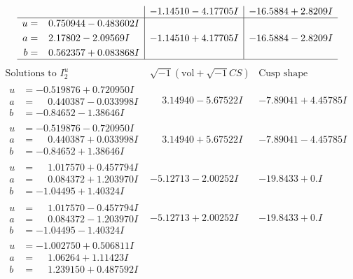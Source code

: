 \documentclass[1p]{elsarticle_modified}
\theoremstyle{definition}
\newcommand{\I}{\sqrt{-1}}
\begin{document}
$$\begin{array}{c|c|c}
 & -1.14510 - 4.17705 I & -16.5884 + 2.8209 I \\ \hline\begin{aligned}
u &= \phantom{-}0.750944 - 0.483602 I \\
a &= \phantom{-}2.17802 - 2.09569 I \\
b &= \phantom{-}0.562357 + 0.083868 I\end{aligned}
 & -1.14510 + 4.17705 I & -16.5884 - 2.8209 I\\
 \hline 
 \end{array}$$\newpage$$\begin{array}{c|c|c}  
\text{Solutions to }I^u_{2}& \I (\text{vol} + \sqrt{-1}CS) & \text{Cusp shape}\\
 \hline 
\begin{aligned}
u &= -0.519876 + 0.720950 I \\
a &= \phantom{-}0.440387 - 0.033998 I \\
b &= -0.84652 - 1.38646 I\end{aligned}
 & \phantom{-}3.14940 - 5.67522 I & -7.89041 + 4.45785 I \\ \hline\begin{aligned}
u &= -0.519876 - 0.720950 I \\
a &= \phantom{-}0.440387 + 0.033998 I \\
b &= -0.84652 + 1.38646 I\end{aligned}
 & \phantom{-}3.14940 + 5.67522 I & -7.89041 - 4.45785 I \\ \hline\begin{aligned}
u &= \phantom{-}1.017570 + 0.457794 I \\
a &= \phantom{-}0.084372 + 1.203970 I \\
b &= -1.04495 + 1.40324 I\end{aligned}
 & -5.12713 - 2.00252 I & -19.8433 + 0. I\phantom{ +0.000000I} \\ \hline\begin{aligned}
u &= \phantom{-}1.017570 - 0.457794 I \\
a &= \phantom{-}0.084372 - 1.203970 I \\
b &= -1.04495 - 1.40324 I\end{aligned}
 & -5.12713 + 2.00252 I & -19.8433 + 0. I\phantom{ +0.000000I} \\ \hline\begin{aligned}
u &= -1.002750 + 0.506811 I \\
a &= \phantom{-}1.06264 + 1.11423 I \\
b &= \phantom{-}1.239150 + 0.487592 I\end{aligned}

\end{array}$$
\end{document}
